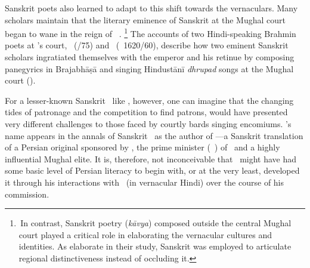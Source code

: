 
Sanskrit poets also learned to adapt to this shift towards the vernaculars. Many scholars maintain that the literary eminence of Sanskrit at the Mughal court began to wane in the reign of \Shahjahan\
\parencites[\eg][]{PollockDeathofSanskrit, Truschke}.%
\footnote{\,In contrast, Sanskrit poetry (\textit{kāvya}) composed outside the central Mughal court played a critical role in elaborating the vernacular cultures and identities. As \textcite{BronnerShulman} elaborate in their study, Sanskrit was employed to articulate regional distinctiveness instead of occluding it.} The accounts of two Hindi-speaking Brahmin poets at \Shahjahan's court, \KavindracaryaSaravati\ (\fl {}/75) and \JagannathaPanditaraja\ (\fl \circa\ 1620/60), describe how two eminent Sanskrit scholars ingratiated themselves with the emperor and his retinue by composing panegyrics in Braja\-bhāṣā and singing Hindustānī \textit{dhrupad} songs at the Mughal court (\cite[50--53]{Truschke}).

For a lesser-known Sanskrit \jyotisa\ like \Nityananda, however, one can imagine that the changing tides of patronage and the competition to find patrons, would have presented very different challenges to those faced by courtly bards singing encomiums. \Nityananda's name appears in the annals of Sanskrit \Jyotihsastra\ as the author of \Siddhantasindhu---a Sanskrit translation of a Persian original sponsored by \AsafKhanshort, the prime minister (\vazir\idafaconsonant\ \azam) of \Shahjahan\ and a highly influential Mughal elite. It is, therefore, not inconceivable that \Nityananda\ might have had some basic level of Persian literacy to begin with, or at the very least, developed it through his interactions with \MullaFarid\ (in vernacular Hindi) over the course of his commission. 

